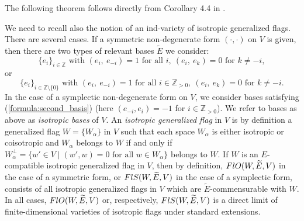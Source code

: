 \documentclass[11pt, a4paper]{article}
\begin{document}
The following theorem follows directly from Corollary 4.4 %
in \cite{PenkovTikhomirov2}.




We need to recall also the notion of an ind-variety of isotropic generalized flags. There are several cases. If a symmetric non-degenerate form $(\cdot,\cdot)$ on $V$ is given, then there are two types of relevant bases $\widetilde{E}$ we consider: $$\{ e_i \}_{i\in \mathbb{Z}}\text{ with } (e_i,~e_{-i})=1\text{ for  all }i,~(e_i,~e_k)=0\text{ for }k\neq -i,$$ %
or \begin{equation}\label{formula:second_basis}
\{e_i\}_{i\in \mathbb{Z}\setminus\{0\}}\text{ with }(e_i,~e_{-i})=1 \text{ for all }i\in \mathbb{Z}_{>0},~ (e_i,~e_k)=0\text{ for }k\neq -i.
\end{equation}
 In the case of a symplectic non-degenerate form on $V$, we consider bases satisfying (\ref{formula:second_basis}) (here $(e_{-i},e_i)=-1$ for $i\in \mathbb{Z}_{>0}$). %
 We refer to bases as above as \emph{isotropic bases} of $V$. An \emph{isotropic generalized flag} in $V$ is by definition a generalized flag $W=\{ W_{\alpha} \}$ in $V$ such that each space $W_{\alpha}$ is either isotropic or coisotropic and  %
$W_{\alpha}$ belongs to $W$ if and only if $W^{\perp}_{\alpha}=\{ w'\in V\mid (w',w)=0\text{ for all }w\in W_{\alpha} \}$ belongs to $W$. If $W$ is an $E$-compatible isotropic generalized flag in $V$, then by  definition, $FlO (W,\widetilde{E},V)$ in the case of a symmetric form, or $FlS(W,\widetilde{E},V)$ in the case of a symplectic form, consists of all isotropic generalized flags in $V$ which are $\widetilde{E}$-commensurable with $W$. %
In all cases, $FlO(W,\widetilde{E},V)$ or, respectively, $FlS(W,\widetilde{E},V)$ is a direct limit of finite-dimensional varieties of isotropic flags under standard extensions.
\end{document}
